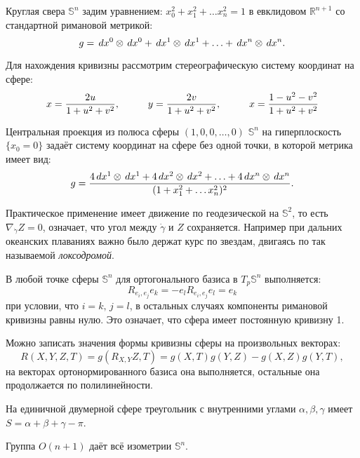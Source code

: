 Круглая свера $\mathbb{S}^n$ задим уравнением: $x_0^2 + x_1^2 + \ldots x_n^2 = 1$ в евклидовом $\mathbb{R}^{n+1}$ со стандартной римановой метрикой:
\begin{equation*}
	g = \, d x^0 \otimes \, d x^0 + \, d x^1 \otimes \, d x^1 + \ldots + \, d x^n \otimes \, d x^n.
\end{equation*}
 
 Для нахождения кривизны рассмотрим стереографическую систему координат на сфере:
 \begin{equation*}
 	x =	\frac{2 u}{1 + u^2 + v^2},
 	\hspace*{1 cm}
 	y =	\frac{2 v}{1 + u^2 + v^2},
 	\hspace*{1 cm}
 	x =	\frac{1 - u^2 - v^2}{1 + u^2 + v^2}
 \end{equation*}

 \begin{to_tas}
 	Центральная проекция из полюса сферы $(1,0,0,\ldots, 0)$ $\mathbb{S}^n$ на гиперплоскость $\{x_0 = 0\}$ задаёт систему координат на сфере без одной точки, в которой метрика имеет вид:
 	\begin{equation*}
 		g = \frac{4 \, d x^1 \otimes \, d x^1 + 4 \, d x^2 \otimes \, d x^2 + \ldots + 4 \, d x^n \otimes \, d x^n}{(1 + x_1^2 + \ldots x_n^2)^2}.
 	\end{equation*}
 \end{to_tas}

Практическое применение имеет движение по геодезической на $\mathbb{S}^2$, то есть $\nabla_{\dot{\gamma}} Z = 0$, означает, что угол между $\dot{\gamma}$ и $Z$ сохраняется. Например при дальних океанских плаваниях важно было держат курс по звездам, двигаясь по так называемой \textit{локсодромой}.

\begin{to_thr}
	В любой точке сферы $\mathbb{S}^n $ для ортогонального базиса в $T_p \mathbb{S}^n $ выполняется:
	\begin{equation*}
		R_{e_i, e_j} e_k = - e_l R_{e_i,e_j}e_l = e_k
	\end{equation*}
	при условии, что $i=k,\,j=l$, в остальных случаях компоненты римановой кривизны равны нулю. Это означает, что сфера имеет постоянную кривизну 1.
\end{to_thr}

Можно записать значения формы кривизны сферы на произвольных векторах:
\begin{equation*}
	R(X,Y,Z,T) = g(R_{X,Y}Z, T) = g(X,T) g(Y,Z) - g(X,Z) g(Y,T),
\end{equation*}
на векторах ортонормированного базиса она выполняется, остальные она продолжается по полилинейности.

\begin{to_tas}
	На единичной двумерной сфере треугольник с внутренними углами $\alpha, \beta,\gamma$ имеет $S = \alpha + \beta + \gamma -\pi$.
\end{to_tas}

\begin{to_tas}
	Группа $O(n+1)$ даёт всё изометрии $\mathbb{S}^n$.
\end{to_tas}
